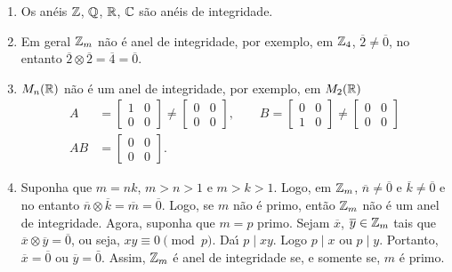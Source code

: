 \begin{exemplos}
    \begin{enumerate}[label={\arabic*})]
        \item Os an{\'e}is $\mathbb{Z}$, $\mathbb{Q}$, $\mathbb{R}$, $\mathbb{C}$ s{\~a}o an{\'e}is de integridade.

        \item Em geral $\mathbb{Z}_m$ n{\~a}o {\'e} anel de integridade, por exemplo, em $\mathbb{Z}_4$, $\overline{2} \neq \overline{0}$, no entanto $\overline{2}\otimes \overline{2} =
            \overline{4} = \overline{0}$.

        \item $M_{n}(\mathbb{R})$ n{\~a}o {\'e} um anel de integridade, por exemplo, em $M_{2}(\mathbb{R})$
        \begin{align*}
            A &= \begin{bmatrix}
                1 & 0\\
                0 & 0
            \end{bmatrix} \neq \begin{bmatrix}
                0 & 0\\
                0 & 0
            \end{bmatrix},\qquad
            B = \begin{bmatrix}
                0 & 0\\
                1 & 0
            \end{bmatrix} \neq \begin{bmatrix}
                0 & 0\\
                0 & 0
            \end{bmatrix}\\
            AB & =\begin{bmatrix}
                0 & 0\\
                0 & 0
            \end{bmatrix}.
        \end{align*}

        \item Suponha que $m = nk$, $m > n > 1$ e $m > k > 1$. Logo, em $\mathbb{Z}_m$, $\overline{n} \neq \overline{0}$ e $\overline{k} \neq \overline{0}$ e no entanto $\overline{n}
            \otimes \overline{k} = \overline{m} = \overline{0}$. Logo, se $m$ n{\~a}o {\'e} primo, ent{\~a}o $\mathbb{Z}_m$ n{\~a}o {\'e} um anel de integridade. Agora, suponha que $m =
            p$ primo. Sejam $\overline{x}$, $\overline{y} \in \mathbb{Z}_m$ tais que $\overline{x}\otimes \overline{y} = \overline{0}$, ou seja, $xy \equiv 0 \pmod p$. Da{\'\i} $p\mid
            xy$. Logo $p\mid x$ ou $p\mid y$. Portanto, $\overline{x} = \overline{0}$ ou $\overline{y} = \bar{0}$. Assim, $\mathbb{Z}_m$ {\'e} anel de integridade se, e somente se, $m$
            {\'e} primo.
    \end{enumerate}
\end{exemplos}



